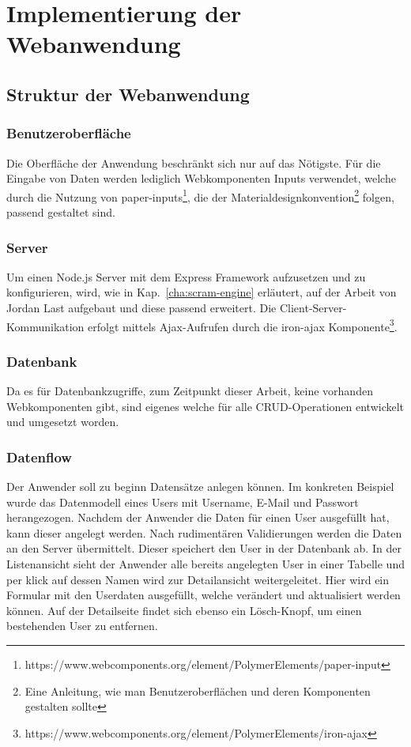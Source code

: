 \chapter{Implementierung der Webanwendung}

\section{Struktur der Webanwendung}
\subsection{Benutzeroberfläche}
Die Oberfläche der Anwendung beschränkt sich nur auf das Nötigste. Für die Eingabe von Daten werden lediglich Webkomponenten Inputs verwendet, welche durch die Nutzung von paper-inputs\footnote{https://www.webcomponents.org/element/PolymerElements/paper-input}, die der Materialdesignkonvention\footnote{Eine Anleitung, wie man Benutzeroberflächen und deren Komponenten gestalten sollte} folgen, passend gestaltet sind.

\subsection{Server}
Um einen Node.js Server mit dem Express Framework aufzusetzen und zu konfigurieren, wird, wie in Kap.~\ref{cha:scram-engine} erläutert, auf der Arbeit von Jordan Last aufgebaut und diese passend erweitert. 
Die Client-Server-Kommunikation erfolgt mittels Ajax-Aufrufen durch die iron-ajax Komponente\footnote{https://www.webcomponents.org/element/PolymerElements/iron-ajax}.
\subsection{Datenbank}
Da es für Datenbankzugriffe, zum Zeitpunkt dieser Arbeit, keine vorhanden Webkomponenten gibt, sind eigenes welche für alle CRUD-Operationen entwickelt und umgesetzt worden.

\subsection{Datenflow}
Der Anwender soll zu beginn Datensätze anlegen können. Im konkreten Beispiel wurde das Datenmodell eines Users mit Username, E-Mail und Passwort herangezogen.
Nachdem der Anwender die Daten für einen User ausgefüllt hat, kann dieser angelegt werden. Nach rudimentären Validierungen werden die Daten an den Server übermittelt. Dieser speichert den User in der Datenbank ab. 
In der Listenansicht sieht der Anwender alle bereits angelegten User in einer Tabelle und per klick auf dessen Namen wird zur Detailansicht weitergeleitet. Hier wird ein Formular mit den Userdaten ausgefüllt, welche verändert und aktualisiert werden können.   
Auf der Detailseite findet sich ebenso ein Lösch-Knopf, um einen bestehenden User zu entfernen.
